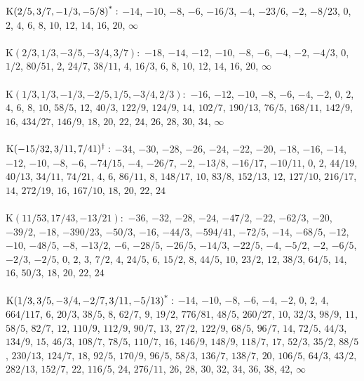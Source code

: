 $\mathrm{K}(2/5, 3/7, -1/3, -5/8)\textsuperscript{*}:$  $-14$, $-10$, $-8$, $-6$, $-16/3$, $-4$, $-23/6$, $-2$, $-8/23$, $0$, $2$, $4$, $6$, $8$, $10$, $12$, $14$, $16$, $20$, $\infty$\\ 
 \ \\ 
$\mathrm{K}(2/3, 1/3, -3/5, -3/4, 3/7):$  $-18$, $-14$, $-12$, $-10$, $-8$, $-6$, $-4$, $-2$, $-4/3$, $0$, $1/2$, $80/51$, $2$, $24/7$, $38/11$, $4$, $16/3$, $6$, $8$, $10$, $12$, $14$, $16$, $20$, $\infty$\\ 
 \ \\ 
$\mathrm{K}(1/3, 1/3, -1/3, -2/5, 1/5, -3/4, 2/3):$  $-16$, $-12$, $-10$, $-8$, $-6$, $-4$, $-2$, $0$, $2$, $4$, $6$, $8$, $10$, $58/5$, $12$, $40/3$, $122/9$, $124/9$, $14$, $102/7$, $190/13$, $76/5$, $168/11$, $142/9$, $16$, $434/27$, $146/9$, $18$, $20$, $22$, $24$, $26$, $28$, $30$, $34$, $\infty$\\ 
 \ \\ 
$\mathrm{K}(-15/32, 3/11, 7/41)\textsuperscript{$\dagger$}:$  $-34$, $-30$, $-28$, $-26$, $-24$, $-22$, $-20$, $-18$, $-16$, $-14$, $-12$, $-10$, $-8$, $-6$, $-74/15$, $-4$, $-26/7$, $-2$, $-13/8$, $-16/17$, $-10/11$, $0$, $2$, $44/19$, $40/13$, $34/11$, $74/21$, $4$, $6$, $86/11$, $8$, $148/17$, $10$, $83/8$, $152/13$, $12$, $127/10$, $216/17$, $14$, $272/19$, $16$, $167/10$, $18$, $20$, $22$, $24$\\ 
 \ \\ 
$\mathrm{K}(11/53, 17/43, -13/21):$  $-36$, $-32$, $-28$, $-24$, $-47/2$, $-22$, $-62/3$, $-20$, $-39/2$, $-18$, $-390/23$, $-50/3$, $-16$, $-44/3$, $-594/41$, $-72/5$, $-14$, $-68/5$, $-12$, $-10$, $-48/5$, $-8$, $-13/2$, $-6$, $-28/5$, $-26/5$, $-14/3$, $-22/5$, $-4$, $-5/2$, $-2$, $-6/5$, $-2/3$, $-2/5$, $0$, $2$, $3$, $7/2$, $4$, $24/5$, $6$, $15/2$, $8$, $44/5$, $10$, $23/2$, $12$, $38/3$, $64/5$, $14$, $16$, $50/3$, $18$, $20$, $22$, $24$\\ 
 \ \\ 
$\mathrm{K}(1/3, 3/5, -3/4, -2/7, 3/11, -5/13)\textsuperscript{*}:$  $-14$, $-10$, $-8$, $-6$, $-4$, $-2$, $0$, $2$, $4$, $664/117$, $6$, $20/3$, $38/5$, $8$, $62/7$, $9$, $19/2$, $776/81$, $48/5$, $260/27$, $10$, $32/3$, $98/9$, $11$, $58/5$, $82/7$, $12$, $110/9$, $112/9$, $90/7$, $13$, $27/2$, $122/9$, $68/5$, $96/7$, $14$, $72/5$, $44/3$, $134/9$, $15$, $46/3$, $108/7$, $78/5$, $110/7$, $16$, $146/9$, $148/9$, $118/7$, $17$, $52/3$, $35/2$, $88/5$, $230/13$, $124/7$, $18$, $92/5$, $170/9$, $96/5$, $58/3$, $136/7$, $138/7$, $20$, $106/5$, $64/3$, $43/2$, $282/13$, $152/7$, $22$, $116/5$, $24$, $276/11$, $26$, $28$, $30$, $32$, $34$, $36$, $38$, $42$, $\infty$\\ 
